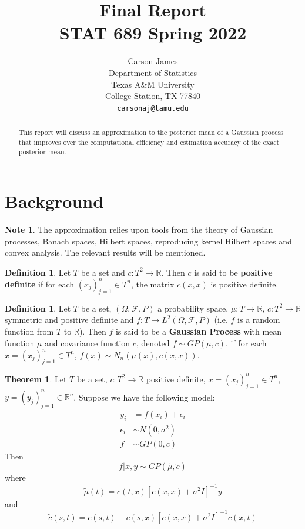 \documentclass{article}
\title{Final Report \\ STAT 689 Spring 2022 }
\author{%
  Carson James\\
  Department of Statistics\\
  Texas A\&M University\\
  College Station, TX 77840 \\
  \texttt{carsonaj@tamu.edu} \\
}
\theoremstyle{definition}
\newtheorem{defn}[definition]{Definition}
\newtheorem{note}[definition]{Note}
\newtheorem{thm}[definition]{Theorem}
\newcommand{\ep}{\epsilon}
\newcommand{\sig}{\sigma}
\newcommand{\Om}{\Omega}
\newcommand{\R}{\mathbb{R}}
\newcommand{\MF}{\mathcal{F}}
\begin{document}
\maketitle

\begin{abstract}
  This report will discuss an approximation to the posterior mean of a Gaussian process that improves over the computational efficiency and estimation accuracy of the exact posterior mean. 
\end{abstract}

\section{Background}
\begin{note}
The approximation relies upon tools from the theory of Gaussian processes, Banach spaces, Hilbert spaces, reproducing kernel Hilbert spaces and convex analysis. The relevant results will be mentioned. 
\end{note}

\begin{defn}
Let $T$ be a set and $c: T^2 \rightarrow \R$. Then $c$ is said to be \textbf{positive definite} if for each $(x_j)_{j=1}^n \in T^n$, the matrix $c(x,x)$ is positive definite. 
\end{defn}

\begin{defn}
Let $T$ be a set, $(\Om, \MF, P)$ a probability space, $\mu : T \rightarrow \R$, $c: T^2 \rightarrow \R$ symmetric and positive definite and $f: T \rightarrow L^2(\Om, \MF, P)$ (i.e. $f$ is a random function from $T$ to $\R$). Then $f$ is said to be a \textbf{Gaussian Process} with mean function $\mu$ and covariance function $c$, denoted $f \sim GP(\mu, c)$, if for each $x = (x_j)_{j=1}^n \in T^n$, $f(x) \sim N_{n}(\mu(x), c(x,x))$. 
\end{defn}

\begin{thm}
Let $T$ be a set, $c: T^2 \rightarrow \R$ positive definite, $x = (x_j)_{j=1}^n \in T^n$, $y = (y_j)_{j=1}^n \in \R^n$. Suppose we have the following model:
\begin{align*}
y_i &= f(x_i) + \ep_i \\
\ep_i &\sim N(0, \sig^2) \\
f &\sim GP(0, c)
\end{align*}
Then $$f|x, y \sim GP(\tilde{\mu}, \tilde{c})$$ where $$\tilde{\mu}(t) = c(t, x)[c(x,x) + \sig^2I]^{-1}y$$ and $$\tilde{c}(s,t) = c(s,t) - c(s,x)[c(x,x) + \sig^2 I]^{-1}c(x,t)$$

\end{thm}
\end{document}
